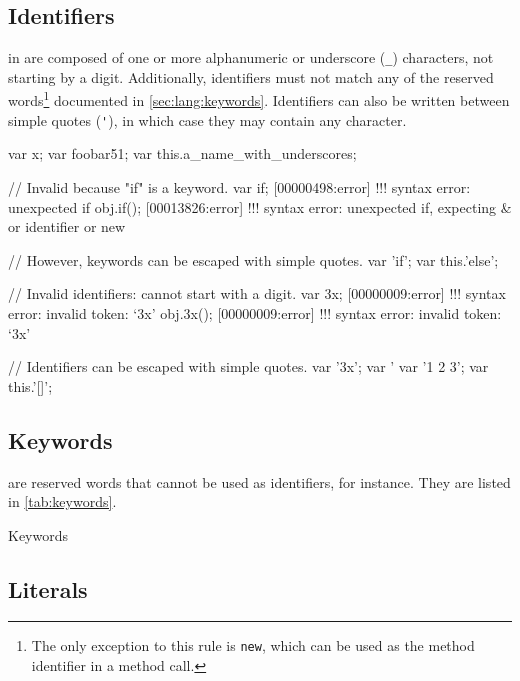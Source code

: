\subsection{Identifiers}
\label{sec:lang:id}


 in \us are composed of one or more alphanumeric or
underscore (\lstinline|_|) characters, not starting by a digit.
Additionally, identifiers must not match any of the \us reserved
words\footnote{
  The only exception to this rule is \lstinline{new}, which can be
  used as the method identifier in a method call.
} documented in \autoref{sec:lang:keywords}. Identifiers can also be written
between simple quotes (\lstinline|'|), in which case they may contain any
character.

\begin{urbiscript}
var x;
var foobar51;
var this.a_name_with_underscores;

// Invalid because "if" is a keyword.
var if;
[00000498:error] !!! syntax error: unexpected if
obj.if();
[00013826:error] !!! syntax error: unexpected if, expecting & or identifier or new

// However, keywords can be escaped with simple quotes.
var 'if';
var this.'else';

// Invalid identifiers: cannot start with a digit.
var 3x;
[00000009:error] !!! syntax error: invalid token: `3x'
obj.3x();
[00000009:error] !!! syntax error: invalid token: `3x'

// Identifiers can be escaped with simple quotes.
var '3x';
var '%
var '1 2 3';
var this.'[]';
\end{urbiscript}

\subsection{Keywords}
\label{sec:lang:keywords}

 are reserved words that cannot be used as identifiers,
for instance.  They are listed in \autoref{tab:keywords}.

\renewcommand{\baselinestretch}{.85}
\begin{table}[\floatpos]
  \centering
  
  \caption{Keywords}
  \label{tab:keywords}
\end{table}
\renewcommand{\baselinestretch}{1}

\subsection{Literals}

